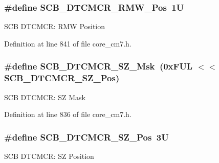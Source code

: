 \subsubsection[{\texorpdfstring{S\+C\+B\+\_\+\+D\+T\+C\+M\+C\+R\+\_\+\+R\+M\+W\+\_\+\+Pos}{SCB_DTCMCR_RMW_Pos}}]{\setlength{\rightskip}{0pt plus 5cm}\#define S\+C\+B\+\_\+\+D\+T\+C\+M\+C\+R\+\_\+\+R\+M\+W\+\_\+\+Pos~1U}\hypertarget{group___c_m_s_i_s___s_c_b_ga11c115ca21511be7e56e997a8bde567a}{}\label{group___c_m_s_i_s___s_c_b_ga11c115ca21511be7e56e997a8bde567a}
S\+CB D\+T\+C\+M\+CR\+: R\+MW Position 

Definition at line 841 of file core\+\_\+cm7.\+h.

\subsubsection[{\texorpdfstring{S\+C\+B\+\_\+\+D\+T\+C\+M\+C\+R\+\_\+\+S\+Z\+\_\+\+Msk}{SCB_DTCMCR_SZ_Msk}}]{\setlength{\rightskip}{0pt plus 5cm}\#define S\+C\+B\+\_\+\+D\+T\+C\+M\+C\+R\+\_\+\+S\+Z\+\_\+\+Msk~(0x\+F\+U\+L $<$$<$ S\+C\+B\+\_\+\+D\+T\+C\+M\+C\+R\+\_\+\+S\+Z\+\_\+\+Pos)}\hypertarget{group___c_m_s_i_s___s_c_b_ga35b381dd367cd1533f5c2b2c88720b72}{}\label{group___c_m_s_i_s___s_c_b_ga35b381dd367cd1533f5c2b2c88720b72}
S\+CB D\+T\+C\+M\+CR\+: SZ Mask 

Definition at line 836 of file core\+\_\+cm7.\+h.

\subsubsection[{\texorpdfstring{S\+C\+B\+\_\+\+D\+T\+C\+M\+C\+R\+\_\+\+S\+Z\+\_\+\+Pos}{SCB_DTCMCR_SZ_Pos}}]{\setlength{\rightskip}{0pt plus 5cm}\#define S\+C\+B\+\_\+\+D\+T\+C\+M\+C\+R\+\_\+\+S\+Z\+\_\+\+Pos~3U}\hypertarget{group___c_m_s_i_s___s_c_b_ga3cacd7498eb3c022ecc7e21a3dfc3c13}{}\label{group___c_m_s_i_s___s_c_b_ga3cacd7498eb3c022ecc7e21a3dfc3c13}
S\+CB D\+T\+C\+M\+CR\+: SZ Position 

